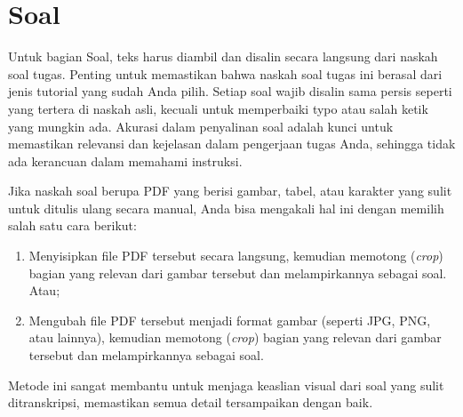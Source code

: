 \section{Soal}


Untuk bagian Soal, teks harus diambil dan disalin secara langsung dari naskah soal tugas. Penting untuk memastikan bahwa naskah soal tugas ini berasal dari jenis tutorial yang sudah Anda pilih. Setiap soal wajib disalin sama persis seperti yang tertera di naskah asli, kecuali untuk memperbaiki typo atau salah ketik yang mungkin ada. Akurasi dalam penyalinan soal adalah kunci untuk memastikan relevansi dan kejelasan dalam pengerjaan tugas Anda, sehingga tidak ada kerancuan dalam memahami instruksi.

Jika naskah soal berupa PDF yang berisi gambar, tabel, atau karakter yang sulit untuk ditulis ulang secara manual, Anda bisa mengakali hal ini dengan memilih salah satu cara berikut: 

\begin{enumerate}
    \item Menyisipkan file PDF tersebut secara langsung, kemudian memotong (\textit{crop}) bagian yang relevan dari gambar tersebut dan melampirkannya sebagai soal. Atau;
    \item Mengubah file PDF tersebut menjadi format gambar (seperti JPG, PNG, atau lainnya), kemudian memotong (\textit{crop}) bagian yang relevan dari gambar tersebut dan melampirkannya sebagai soal.
\end{enumerate}

Metode ini sangat membantu untuk menjaga keaslian visual dari soal yang sulit ditranskripsi, memastikan semua detail tersampaikan dengan baik.